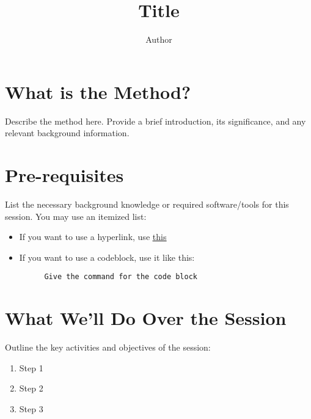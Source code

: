\documentclass[a4paper,12pt]{article}
\title{#1}
\newcommand{\titlepacket}[1]{
    \title{#1}
}
\begin{document}
\titlepacket{Title}
\author{Author}
\maketitle

\section{What is the Method?}

Describe the method here. Provide a brief introduction, its significance, and any relevant background information.

\section{Pre-requisites}
List the necessary background knowledge or required software/tools for this session. You may use an itemized list:
\begin{itemize}
    \item If you want to use a hyperlink, use \href{giveyourlink}{\uline{this}}
    \item If you want to use a codeblock, use it like this:
\end{itemize}
       \begin{verbatim}
         Give the command for the code block
       \end{verbatim}



\section{What We'll Do Over the Session}
Outline the key activities and objectives of the session:
\begin{enumerate}
    \item Step 1
    \item Step 2
    \item Step 3
\end{enumerate}
\end{document}
